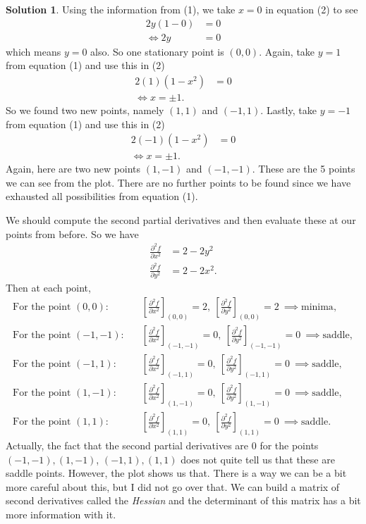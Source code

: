 \documentclass[12pt]{report} %
\theoremstyle{definition}
\newtheorem{solution}{Solution}
\begin{document}
\begin{solution}
Using the information from (1), we take $x=0$ in equation (2) to see
\begin{align*}
    2y(1-0)&=0\\
    \iff 2y&=0
\end{align*}
which means $y=0$ also.  So one stationary point is $(0,0)$. Again, take $y=1$ from equation (1) and use this in (2)
\begin{align*}
    2(1)(1-x^2)&=0\\
    \iff x=\pm 1.
\end{align*}
So we found two new points, namely $(1,1)$ and $(-1,1)$.  Lastly, take $y=-1$ from equation (1) and use this in (2)
\begin{align*}
    2(-1)(1-x^2)&=0\\
    \iff x=\pm 1.
\end{align*}
Again, here are two new points $(1,-1)$ and $(-1,-1)$.  These are the 5 points we can see from the plot. There are no further points to be found since we have exhausted all possibilities from equation (1).
\item We should compute the second partial derivatives and then evaluate these at our points from before. So we have
\begin{align*}
    \frac{\partial ^2 f}{\partial x^2} &= 2-2y^2\\
    \frac{\partial^2 f}{\partial y^2} &= 2-2x^2.
\end{align*}
Then at each point,
\begin{align*}
    \textrm{For the point $(0,0)$:}&\quad \left[\frac{\partial^2 f}{\partial x^2}\right]_{(0,0)} = 2, ~ \left[\frac{\partial^2 f}{\partial y^2}\right]_{(0,0)} = 2 ~ \implies \textrm{minima},\\
    \textrm{For the point $(-1,-1)$:}&\quad \left[\frac{\partial^2 f}{\partial x^2}\right]_{(-1,-1)} = 0, ~ \left[\frac{\partial^2 f}{\partial y^2}\right]_{(-1,-1)} = 0 ~ \implies \textrm{saddle},\\
    \textrm{For the point $(-1,1)$:}&\quad \left[\frac{\partial^2 f}{\partial x^2}\right]_{(-1,1)} = 0, ~ \left[\frac{\partial^2 f}{\partial y^2}\right]_{(-1,1)} = 0 ~ \implies \textrm{saddle},\\
    \textrm{For the point $(1,-1)$:}&\quad \left[\frac{\partial^2 f}{\partial x^2}\right]_{(1,-1)} = 0, ~ \left[\frac{\partial^2 f}{\partial y^2}\right]_{(1,-1)} = 0 ~ \implies \textrm{saddle},\\
    \textrm{For the point $(1,1)$:}&\quad \left[\frac{\partial^2 f}{\partial x^2}\right]_{(1,1)} = 0, ~ \left[\frac{\partial^2 f}{\partial y^2}\right]_{(1,1)} = 0 ~ \implies \textrm{saddle}.
\end{align*}
Actually, the fact that the second partial derivatives are $0$ for the points $(-1,-1), (1,-1)$, $(-1,1), (1,1)$ does not quite tell us that these are saddle points.  However, the plot shows us that.  There is a way we can be a bit more careful about this,  but I did not go over that.  We can build a matrix of second derivatives called the \emph{Hessian} and the determinant of this matrix has a bit more information with it.
\end{solution}
\vspace*{.5cm}
\end{document}
